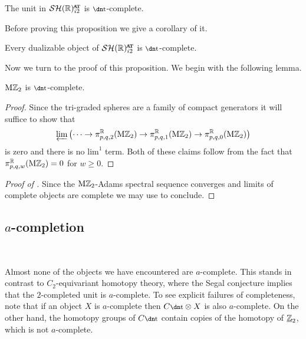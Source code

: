 
\begin{prop}\label{prop:unit-ta-complete}
 The unit in $\SHRat$ is $\ta$-complete.
\end{prop}

Before proving this proposition we give a corollary of it.

\begin{cor}\label{cor:dualizable-ta-complete}
  Every dualizable object of $\SHgc$ is $\ta$-complete.
\end{cor}

Now we turn to the proof of this proposition.
We begin with the following lemma.

\begin{lem} \label{lem:Z-ta-complete}
  $\mathrm{M}\mathbb{Z}_{2}$ is $\ta$-complete.
\end{lem}

\begin{proof}
  Since the tri-graded spheres are a family of compact generators it will suffice to show that
  \[ \varprojlim \left( \cdots \to \pi_{p,q,2} ^{\mathbb{R}} (\mathrm{M}\mathbb{Z}_{2}) \to \pi_{p,q,1} ^{\mathbb{R}} (\mathrm{M}\mathbb{Z}_{2}) \to \pi_{p,q,0} ^{\mathbb{R}} (\mathrm{M}\mathbb{Z}_{2}) \right) \]
  is zero and there is no $\mathrm{lim}^1$ term. Both of these claims follow from the fact that $\pi_{p,q,w}^{\mathbb{R}} (\mathrm{M}\mathbb{Z}_{2}) = 0$ for $w \geq 0$.
\end{proof}

\begin{proof}[Proof of ]
  Since the $\mathrm{M}\mathbb{Z}_{2}$-Adams spectral sequence converges \cite{MAdamsConv}  and limits of complete objects are complete we may use  to conclude.
\end{proof}

\subsection{$a$-completion} \label{sec:a-comp}\ 

Almost none of the objects we have encountered are $a$-complete.  This stands in contrast to $C_2$-equivariant homotopy theory, where the Segal conjecture implies that the $2$-completed unit is $a$-complete. To see explicit failures of completeness, note that if an object $X$ is $a$-complete then $C\ta \otimes X $ is also $a$-complete. On the other hand, the homotopy groups of $C\ta$ contain copies of the homotopy of $\underline{\mathbb{Z}}_{2}$, which is not $a$-complete.

